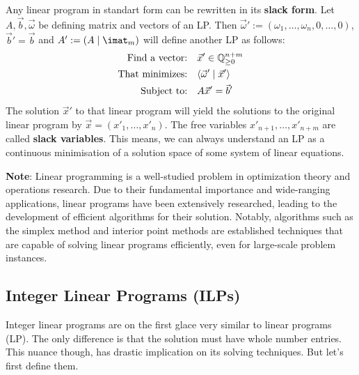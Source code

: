 \begin{observation}
    \label{obs:lp_slack_form}
    Any linear program in standart form can be rewritten in its \textbf{slack form}. Let $A, \vec b, \vec\omega$ be defining matrix and vectors of an LP. Then $\vec\omega' := (\omega_1, \dots, \omega_n, 0, \dots, 0)$, $\vec b' = \vec b$ and $A' := (A\mid\imat_m)$ will define another LP as follows:
    \begin{align*}
        \text{Find a vector:} & \quad \vec x' \in \mathbb{Q}^{n+m}_{\geq 0} \\
        \text{That minimizes:} & \quad \langle \vec \omega' \mid \vec x' \rangle\\
        \text{Subject to:} & \quad A\vec x' = \vec b' \\
    \end{align*}
    The solution $\vec x'$ to that linear program will yield the solutions to the original linear program by $\vec x = (x'_1, \dots, x'_n)$. The free variables $x'_{n+1}, \dots, x'_{n+m}$ are called \textbf{slack variables}. This means, we can always understand an LP as a continuous minimisation of a solution space of some system of linear equations.
\end{observation}

\textbf{Note}: Linear programming is a well-studied problem in optimization theory and operations research. Due to their fundamental importance and wide-ranging applications, linear programs have been extensively researched, leading to the development of efficient algorithms for their solution. Notably, algorithms such as the simplex method and interior point methods are established techniques that are capable of solving linear programs efficiently, even for large-scale problem instances.

\subsection{Integer Linear Programs (ILPs)}
Integer linear programs are on the first glace very similar to linear programs (LP). The only difference is that the solution must have whole number entries. This nuance though, has drastic implication on its solving techniques. But let's first define them.

